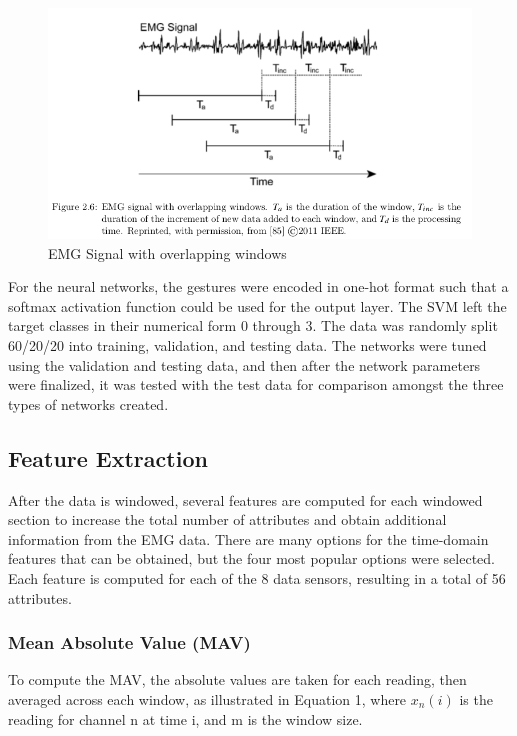 \documentclass{article}
\begin{document}
\begin{figure}[!htb]
\caption{EMG Signal with overlapping windows}
\centering
\includegraphics[scale=0.5]{Images/EMG_Signal.png}
\end{figure}

For the neural networks, the gestures were encoded in one-hot format such that a softmax activation function could be used for the output layer. The SVM left the target classes in their numerical form 0 through 3. The data was randomly split 60/20/20 into training, validation, and testing data. The networks were tuned using the validation and testing data, and then after the network parameters were finalized, it was tested with the test data for comparison amongst the three types of networks created. 

\subsection*{Feature Extraction}
After the data is windowed, several features are computed for each windowed section to increase the total number of attributes and obtain additional information from the EMG data. There are many options for the time-domain features that can be obtained, but the four most popular options were selected. Each feature is computed for each of the 8 data sensors, resulting in a total of 56 attributes.

\subsubsection*{Mean Absolute Value (MAV)} To compute the MAV, the absolute values are taken for each reading, then averaged across each window, as illustrated in Equation 1, where \(x_n(i)\) is the reading for channel n at time i, and m is the window size.
\end{document}
